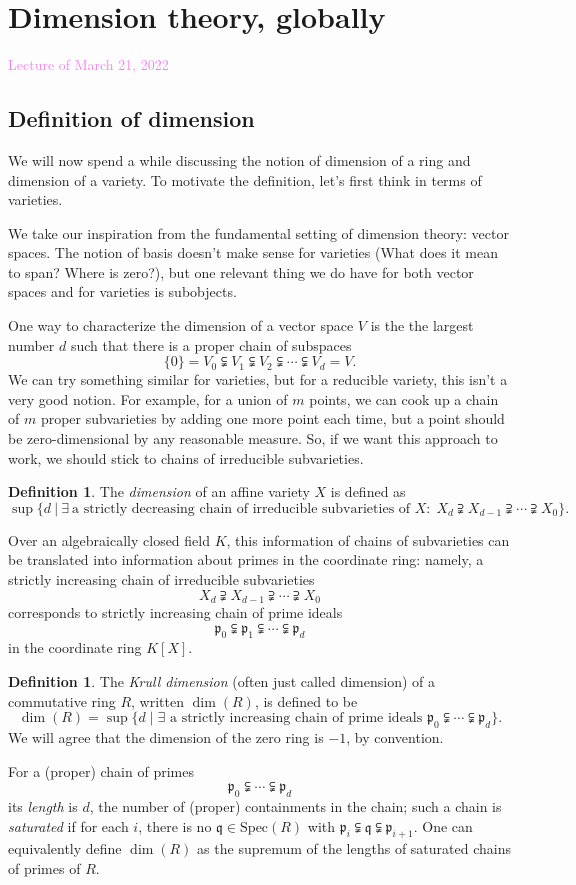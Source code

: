 \documentclass{amsart}[12pt]
\newcommand{\Mar}[1]{\textcolor{violet}{Lecture of March #1, 2022}}
\newcommand{\fp}{{\mathfrak p}}
\newcommand{\p}{{\mathfrak p}}
\newcommand{\q}{{\mathfrak q}}
\numberwithin{equation}{section}
\theoremstyle{plain} %
\theoremstyle{definition}
\newtheorem{defn}[equation]{Definition}
\theoremstyle{remark}
\renewcommand{\sec}[1]{\section{#1}}
\newcommand{\ssec}[1]{\subsection{#1}}
\newcommand{\Spec}{\mathrm{Spec}}
\begin{document}
\sec{Dimension theory, globally}


\Mar{21}

\ssec{Definition of dimension}

We will now spend a while discussing the notion of dimension of a ring and dimension of a variety. To motivate the definition, let's first think in terms of varieties. 

We take our inspiration from the fundamental setting of dimension theory: vector spaces. The notion of basis doesn't make sense for varieties (What does it mean to span? Where is zero?), but one relevant thing we do have for both vector spaces and for varieties is subobjects.

One way to characterize the dimension of a vector space $V$ is the the largest number $d$ such that there is a proper chain of subspaces
\[ \{0\} = V_0 \subsetneqq V_1 \subsetneqq V_2 \subsetneqq \cdots \subsetneqq V_d = V.\]
We can try something similar for varieties, but for a reducible variety, this isn't a very good notion. For example, for a union of $m$ points, we can cook up a chain of $m$ proper subvarieties by adding one more point each time, but a point should be zero-dimensional by any reasonable measure. So, if we want this approach to work, we should stick to chains of irreducible subvarieties.

\begin{defn} The \emph{dimension} of an affine variety $X$ is defined as
\[ \sup \{ d \ | \ \exists \ \text{a strictly decreasing chain of irreducible subvarieties of $X$:} \ \ X_d \supsetneqq X_{d-1} \supsetneqq \cdots \supsetneqq X_0\}.\]
\end{defn}

Over an algebraically closed field $K$, this information of chains of subvarieties can be translated into information about primes in the coordinate ring: namely, a strictly increasing chain of irreducible subvarieties
\[X_d \supsetneqq X_{d-1} \supsetneqq \cdots \supsetneqq X_0\]
corresponds to strictly increasing chain of prime ideals
\[\p_0 \subsetneqq \p_{1} \subsetneqq \cdots \subsetneqq \p_d\]
in the coordinate ring $K[X]$.

\begin{defn} The {\em Krull dimension} (often just called dimension) of a commutative ring $R$, written $\dim(R)$,  is defined to be
$$
\dim(R)=\sup \{d \mid \exists \text{ a strictly increasing chain of prime ideals } \fp_0 \subsetneqq \cdots \subsetneqq \fp_d\}.
$$
We will agree that the dimension of the zero ring is $-1$, by convention. 

For a (proper) chain of primes
\[\fp_0 \subsetneqq \cdots \subsetneqq \fp_d\]
its \emph{length} is $d$, the number of (proper) containments in the chain; such a chain is \emph{saturated} if for each $i$, there is no $\q\in \Spec(R)$ with ${\p_i \subsetneqq \q \subsetneqq \p_{i+1}}$. One can equivalently define $\dim(R)$ as the supremum of the lengths of saturated chains of primes of $R$.
\end{defn}
\end{document}
